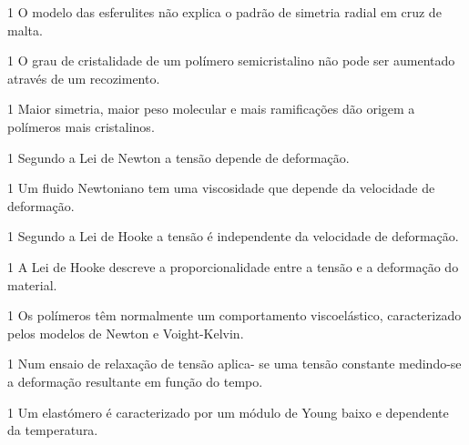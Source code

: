 \documentclass[\mainfilename]{subfiles}
\begin{document}
\begin{questionBox}1{ %
    O modelo das esferulites não explica o padrão de simetria radial em cruz de malta.
} %
    \AF
\end{questionBox}
\begin{questionBox}1{ %
    O grau de cristalidade de um polímero semicristalino não pode ser aumentado através de um recozimento.
} %
    \AF
\end{questionBox}
\begin{questionBox}1{ %
    Maior simetria, maior peso molecular e mais ramificações dão origem a polímeros mais cristalinos.
} %
    \AF
\end{questionBox}
\begin{questionBox}1{ %
    Segundo a Lei de Newton a tensão depende de deformação.
} %
    \AF
\end{questionBox}
\begin{questionBox}1{ %
    Um fluido Newtoniano tem uma viscosidade que depende da velocidade de deformação.
} %
    \AF
\end{questionBox}
\begin{questionBox}1{ %
    Segundo a Lei de Hooke a tensão é independente da velocidade de deformação.
} %
    \AT
\end{questionBox}
\begin{questionBox}1{ %
    A Lei de Hooke descreve a proporcionalidade entre a tensão e a deformação do material.
} %
    \AT
\end{questionBox}
\begin{questionBox}1{ %
    Os polímeros têm normalmente um comportamento viscoelástico, caracterizado pelos modelos de Newton e Voight-Kelvin.
} %
    \AF
\end{questionBox}
\begin{questionBox}1{ %
    Num ensaio de relaxação de tensão aplica- se uma tensão constante medindo-se a deformação resultante em função do tempo.
} %
    \AF
\end{questionBox}
\begin{questionBox}1{ %
    Um elastómero é caracterizado por um módulo de Young baixo e dependente da temperatura.
} %
    \AT
\end{questionBox}
\end{document}
